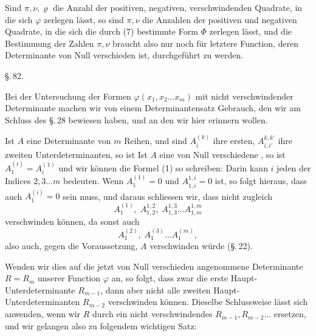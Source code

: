 

Sind $\pi, \nu, \varrho$ die Anzahl der positiven, negativen, verschwindenden Quadrate, in die sich $\varphi$ zerlegen lässt, so sind $\pi, \nu$ die
Anzahlen der positiven und negativen Quadrate, in die sich die
durch (7) bestimmte Form $\Phi$ zerlegen lässt, und die Bestimmung der Zahlen $\pi, \nu$ braucht also nur noch für letztere Function, deren Determinante von Null verschieden ist, durchgeführt
zu werden.

\begin{center}
\S.\,82.

\end{center}

Bei der Untersuchung der Formen $\varphi(x_1, x_2 \ldots x_m)$ mit nicht
verschwindender Determinante machen wir von einem Determinantensatz Gebrauch, den wir am Schluss des \S.\,28 bewiesen
haben, und an den wir hier erinnern wollen.

Ist $A$ eine Determinante von $m$ Reihen, und sind $A_i^{(k)}$ ihre
ersten, $A_{i,i'}^{k,k'}$ ihre zweiten Unterdeterminanten, so ist
Ist $A$ eine von Null verschiedene , so ist $A_1^{(i)} = A_i^{(1)}$ und wir können die Formel (1) so
schreiben:
Darin kann $i$ jeden der Indices $2, 3 \ldots m$ bedeuten. Wenn
$A_1^{(1)} = 0$ und $A_{1,i}^{1,i} = 0$ ist, so folgt hieraus, dass auch $A_1^{(i)} = 0$
sein muss, und daraus schliessen wir, dass nicht zugleich
\[
A_1^{(1)}, \; A_{1,2}^{1,2}, \; A_{1,3}^{1,3} \ldots A_{1,m}^{1,m}
\]
verschwinden können, da sonst auch
\[
A_1^{(2)}, \; A_1^{(3)} \ldots A_1^{(m)},
\]
also auch, gegen die Voraussetzung, $A$ verschwinden würde (\S.\,22).

Wenden wir dies auf die jetzt von Null verschieden angenommene Determinante $R = R_m$ unserer Function $\varphi$ an, so
folgt, dass zwar die erste Haupt-Unterdeterminante $R_{m-1}$, dann
aber nicht alle zweiten Haupt-Unterdeterminanten $R_{m-2}$ verschwinden können. Dieselbe Schlussweise lässt sich anwenden,
wenn wir $R$ durch ein nicht verschwindendes $R_{m-1}, R_{m-2} \ldots$
ersetzen, und wir gelangen also zu folgendem wichtigen Satz:
